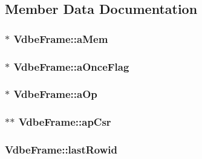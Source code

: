 \subsection{Member Data Documentation}
\hypertarget{struct_vdbe_frame_a98b9eabf633e77d4ae2dfe9d13a43fdf}{
\subsubsection[{a\-Mem}]{$\ast$ Vdbe\-Frame\-::a\-Mem}}\label{struct_vdbe_frame_a98b9eabf633e77d4ae2dfe9d13a43fdf}
\hypertarget{struct_vdbe_frame_a92608c14f2aa3be81e65d59000ef8bd8}{
\subsubsection[{a\-Once\-Flag}]{$\ast$ Vdbe\-Frame\-::a\-Once\-Flag}}\label{struct_vdbe_frame_a92608c14f2aa3be81e65d59000ef8bd8}
\hypertarget{struct_vdbe_frame_a0e5670c52e8eeb7e66bf1e3bff8ce2b5}{
\subsubsection[{a\-Op}]{$\ast$ Vdbe\-Frame\-::a\-Op}}\label{struct_vdbe_frame_a0e5670c52e8eeb7e66bf1e3bff8ce2b5}
\hypertarget{struct_vdbe_frame_a5d373b3a195dbd1a31f5aa0dbe1822ee}{
\subsubsection[{ap\-Csr}]{$\ast$$\ast$ Vdbe\-Frame\-::ap\-Csr}}\label{struct_vdbe_frame_a5d373b3a195dbd1a31f5aa0dbe1822ee}
\hypertarget{struct_vdbe_frame_af655193217fb53c7acab9d24c94344aa}{
\subsubsection[{last\-Rowid}]{ Vdbe\-Frame\-::last\-Rowid}}\label{struct_vdbe_frame_af655193217fb53c7acab9d24c94344aa}
